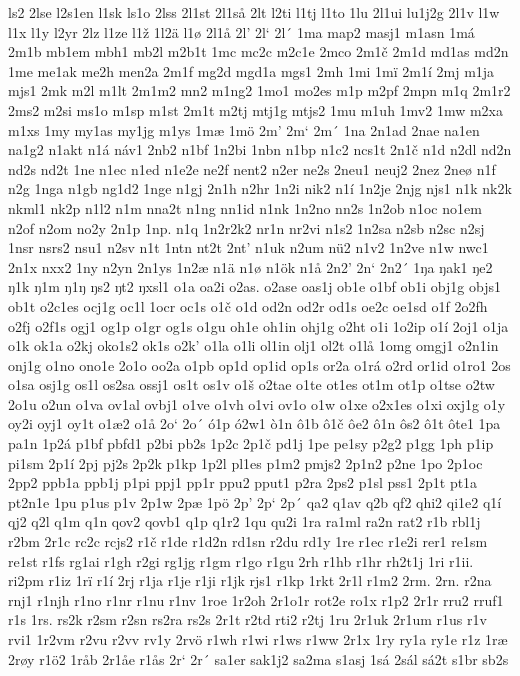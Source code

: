 ls2
2lse
l2s1en
l1sk
ls1o
2lss
2l1st
2l1så
2lt
l2ti
l1tj
l1to
1lu
2l1ui
lu1j2g
2l1v
l1w
l1x
l1y
l2yr
2lz
l1ze
l1ž
1l2ä
l1ø
2l1å
2l'
2l`
2l´
1ma
map2
masj1
m1asn
1má
2m1b
mb1em
mbh1
mb2l
m2b1t
1mc
mc2c
m2c1e
2mco
2m1č
2m1d
md1as
md2n
1me
me1ak
me2h
men2a
2m1f
mg2d
mgd1a
mgs1
2mh
1mi
1mï
2m1í
2mj
m1ja
mjs1
2mk
m2l
m1lt
2m1m2
mn2
m1ng2
1mo1
mo2es
m1p
m2pf
2mpn
m1q
2m1r2
2ms2
m2si
ms1o
m1sp
m1st
2m1t
m2tj
mtj1g
mtjs2
1mu
m1uh
1mv2
1mw
m2xa
m1xs
1my
my1as
my1jg
m1ys
1mæ
1mö
2m'
2m`
2m´
1na
2n1ad
2nae
na1en
na1g2
n1akt
n1á
náv1
2nb2
n1bf
1n2bi
1nbn
n1bp
n1c2
ncs1t
2n1č
n1d
n2dl
nd2n
nd2s
nd2t
1ne
n1ec
n1ed
n1e2e
ne2f
nent2
n2er
ne2s
2neu1
neuj2
2nez
2neø
n1f
n2g
1nga
n1gb
ng1d2
1nge
n1gj
2n1h
n2hr
1n2i
nik2
n1í
1n2je
2njg
njs1
n1k
nk2k
nkml1
nk2p
n1l2
n1m
nna2t
n1ng
nn1id
n1nk
1n2no
nn2s
1n2ob
n1oc
no1em
n2of
n2om
no2y
2n1p
1np.
n1q
1n2r2k2
nr1n
nr2vi
n1s2
1n2sa
n2sb
n2sc
n2sj
1nsr
nsrs2
nsu1
n2sv
n1t
1ntn
nt2t
2nt'
n1uk
n2um
nü2
n1v2
1n2ve
n1w
nwc1
2n1x
nxx2
1ny
n2yn
2n1ys
1n2æ
n1ä
n1ø
n1ök
n1å
2n2'
2n`
2n2´
1ŋa
ŋak1
ŋe2
ŋ1k
ŋ1m
ŋ1ŋ
ŋs2
ŋt2
ŋxsl1
o1a
oa2i
o2as.
o2ase
oas1j
ob1e
o1bf
ob1i
obj1g
objs1
ob1t
o2c1es
ocj1g
oc1l
1ocr
oc1s
o1č
o1d
od2n
od2r
od1s
oe2c
oe1sd
o1f
2o2fh
o2fj
o2f1s
ogj1
og1p
o1gr
og1s
o1gu
oh1e
oh1in
ohj1g
o2ht
o1i
1o2ip
o1í
2oj1
o1ja
o1k
ok1a
o2kj
oko1s2
ok1s
o2k'
o1la
o1li
ol1in
olj1
ol2t
o1lå
1omg
omgj1
o2n1in
onj1g
o1no
ono1e
2o1o
oo2a
o1pb
op1d
op1id
op1s
or2a
o1rá
o2rd
or1id
o1ro1
2os
o1sa
osj1g
os1l
os2sa
ossj1
os1t
os1v
o1š
o2tae
o1te
ot1es
ot1m
ot1p
o1tse
o2tw
2o1u
o2un
o1va
ov1al
ovbj1
o1ve
o1vh
o1vi
ov1o
o1w
o1xe
o2x1es
o1xi
oxj1g
o1y
oy2i
oyj1
oy1t
o1æ2
o1å
2o`
2o´
ó1p
ó2w1
ò1n
ô1b
ô1č
ôe2
ô1n
ôs2
ô1t
ôte1
1pa
pa1n
1p2á
p1bf
pbfd1
p2bi
pb2s
1p2c
2p1č
pd1j
1pe
pe1sy
p2g2
p1gg
1ph
p1ip
pi1sm
2p1í
2pj
pj2s
2p2k
p1kp
1p2l
pl1es
p1m2
pmjs2
2p1n2
p2ne
1po
2p1oc
2pp2
ppb1a
ppb1j
p1pi
ppj1
pp1r
ppu2
pput1
p2ra
2ps2
p1sl
pss1
2p1t
pt1a
pt2n1e
1pu
p1us
p1v
2p1w
2pæ
1pö
2p'
2p`
2p´
qa2
q1av
q2b
qf2
qhi2
qi1e2
q1í
qj2
q2l
q1m
q1n
qov2
qovb1
q1p
q1r2
1qu
qu2i
1ra
ra1ml
ra2n
rat2
r1b
rbl1j
r2bm
2r1c
rc2c
rcjs2
r1č
r1de
r1d2n
rd1sn
r2du
rd1y
1re
r1ec
r1e2i
rer1
re1sm
re1st
r1fs
rg1ai
r1gh
r2gi
rg1jg
r1gm
r1go
r1gu
2rh
r1hb
r1hr
rh2t1j
1ri
r1ii.
ri2pm
r1iz
1rï
r1í
2rj
r1ja
r1je
r1ji
r1jk
rjs1
r1kp
1rkt
2r1l
r1m2
2rm.
2rn.
r2na
rnj1
r1njh
r1no
r1nr
r1nu
r1nv
1roe
1r2oh
2r1o1r
rot2e
ro1x
r1p2
2r1r
rru2
rruf1
r1s
1rs.
rs2k
r2sm
r2sn
rs2ra
rs2s
2r1t
r2td
rti2
r2tj
1ru
2r1uk
2r1um
r1us
r1v
rvi1
1r2vm
r2vu
r2vv
rv1y
2rvö
r1wh
r1wi
r1ws
r1ww
2r1x
1ry
ry1a
ry1e
r1z
1ræ
2røy
r1ö2
1råb
2r1åe
r1ås
2r`
2r´
sa1er
sak1j2
sa2ma
s1asj
1sá
2sál
sá2t
s1br
sb2s
